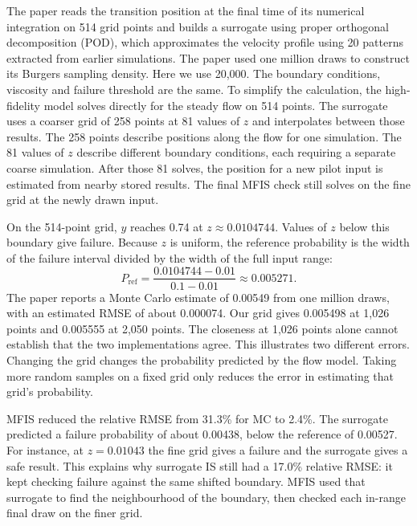 \documentclass[11pt,a4paper]{article}
\begin{document}
The paper reads the transition position at the final time of its numerical integration on 514 grid points and builds a surrogate using proper orthogonal decomposition (POD), which approximates the velocity profile using 20 patterns extracted from earlier simulations. The paper used one million draws to construct its Burgers sampling density. Here we use 20,000. The boundary conditions, viscosity and failure threshold are the same. To simplify the calculation, the high-fidelity model solves directly for the steady flow on 514 points. The surrogate uses a coarser grid of 258 points at 81 values of $z$ and interpolates between those results. The 258 points describe positions along the flow for one simulation. The 81 values of $z$ describe different boundary conditions, each requiring a separate coarse simulation. After those 81 solves, the position for a new pilot input is estimated from nearby stored results. The final MFIS check still solves on the fine grid at the newly drawn input.

On the 514-point grid, $y$ reaches 0.74 at $z\approx0.0104744$. Values of $z$ below this boundary give failure. Because $z$ is uniform, the reference probability is the width of the failure interval divided by the width of the full input range:
\begin{equation}
P_{\mathrm{ref}}=\frac{0.0104744-0.01}{0.1-0.01}\approx0.005271.
\end{equation}
The paper reports a Monte Carlo estimate of 0.00549 from one million draws, with an estimated RMSE of about 0.000074. Our grid gives 0.005498 at 1,026 points and 0.005555 at 2,050 points. The closeness at 1,026 points alone cannot establish that the two implementations agree. This illustrates two different errors. Changing the grid changes the probability predicted by the flow model. Taking more random samples on a fixed grid only reduces the error in estimating that grid's probability.

\begin{table}[H]\centering\small

\caption{Burgers results at $n=2{,}000$ with 40 runs. Errors and normal-interval coverage refer to the 514-point numerical model. Pilot and surrogate-construction costs are separate.}\label{tab:burgers}
\end{table}

MFIS reduced the relative RMSE from 31.3\% for MC to 2.4\%. The surrogate predicted a failure probability of about 0.00438, below the reference of 0.00527. For instance, at $z=0.01043$ the fine grid gives a failure and the surrogate gives a safe result. This explains why surrogate IS still had a 17.0\% relative RMSE: it kept checking failure against the same shifted boundary. MFIS used that surrogate to find the neighbourhood of the boundary, then checked each in-range final draw on the finer grid.
\end{document}
